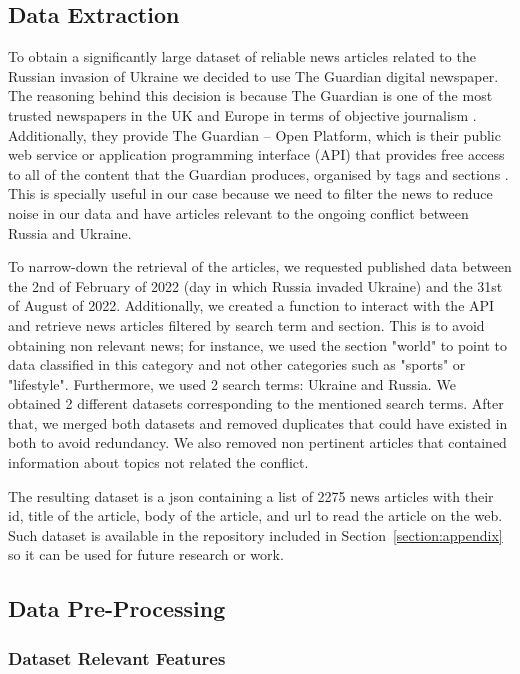 \documentclass[twoside,11pt,a4paper]{article}
\begin{document}
\subsection{Data Extraction}
To obtain a significantly large dataset of reliable news articles related to the Russian invasion of Ukraine we decided to use The Guardian digital newspaper. The reasoning behind this decision is because The Guardian is one of the most trusted newspapers in the UK and Europe in terms of objective journalism \citep{matsa_western_2018}. Additionally, they provide The Guardian – Open Platform, which is their public web service or application programming interface (API) that provides free access to all of the content that the Guardian produces, organised by tags and sections \citep{noauthor_theguardian_nodate}. This is specially useful in our case because we need to filter the news to reduce noise in our data and have articles relevant to the ongoing conflict between Russia and Ukraine. 

To narrow-down the retrieval of the articles, we requested published data between the 2nd of February of 2022 (day in which Russia invaded Ukraine) and the 31st of August of 2022. Additionally, we created a function to interact with the API and retrieve news articles filtered by search term and section. This is to avoid obtaining non relevant news; for instance, we used the section "world" to point to data classified in this category and not other categories such as "sports" or "lifestyle". Furthermore, we used 2 search terms: Ukraine and Russia. We obtained 2 different datasets corresponding to the mentioned search terms. After that, we merged both datasets and removed duplicates that could have existed in both to avoid redundancy. We also removed non pertinent articles that contained information about topics not related the conflict.

The resulting dataset is a json containing a list of 2275 news articles with their id, title of the article, body of the article, and url to read the article on the web. Such dataset is available in the repository included in Section~\ref{section:appendix} so it can be used for future research or work.

\subsection{Data Pre-Processing}

\subsubsection{Dataset Relevant Features}
\end{document}
